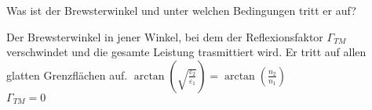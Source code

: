 \begin{question}[section=4,name={Brewsterwinkel 2},difficulty=,quantity=,type=thr,tags={20131210}]
	Was ist der Brewsterwinkel und unter welchen Bedingungen tritt er auf?
	
	
\end{question}
\begin{solution}
	Der Brewsterwinkel in jener Winkel, bei dem der Reflexionsfaktor $\Gamma_{TM}$ verschwindet und die gesamte Leistung trasmittiert wird. Er tritt auf allen glatten Grenzflächen auf.
	$\arctan \left ( \sqrt{\frac{\varepsilon_2}{\varepsilon_1}} \right )=\arctan \left ( \frac{n_2}{n_1} \right )$\\
	$\Gamma_{TM} = 0$
\end{solution}